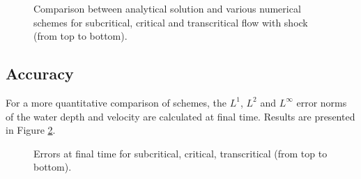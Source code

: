 \begin{figure}[H]
\begin{minipage}[t]{0.5\textwidth}
 \centering
\end{minipage}%
\begin{minipage}[t]{0.5\textwidth}
 \centering
\end{minipage}
\begin{minipage}[t]{0.5\textwidth}
 \centering
\end{minipage}%
\begin{minipage}[t]{0.5\textwidth}
 \centering
\end{minipage}
\begin{minipage}[t]{0.5\textwidth}
 \centering
\end{minipage}%
\begin{minipage}[t]{0.5\textwidth}
 \centering
\end{minipage}
 \caption{Comparison between analytical solution and various  numerical schemes
 for subcritical, critical and transcritical flow with shock (from top to bottom).}\label{fig:bumpsub:fig:comp}
\end{figure}

\subsection{Accuracy}

For a more quantitative comparison of schemes, the $L^1$, $L^2$ and $L^\infty$ error norms
of the water depth and velocity are calculated at final time.
Results are presented in Figure \ref{fig:bump:errors}.

\begin{figure}[H]
  \centering
  \caption{Errors at final time for subcritical, critical, transcritical (from top to bottom).}\label{fig:bump:errors}
\end{figure}

